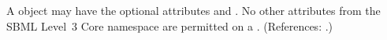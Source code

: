 A \KineticLaw object may have the optional attributes  and
.  No other attributes from the SBML Level~3 Core namespace
are permitted on a \KineticLaw.  (References: .)

